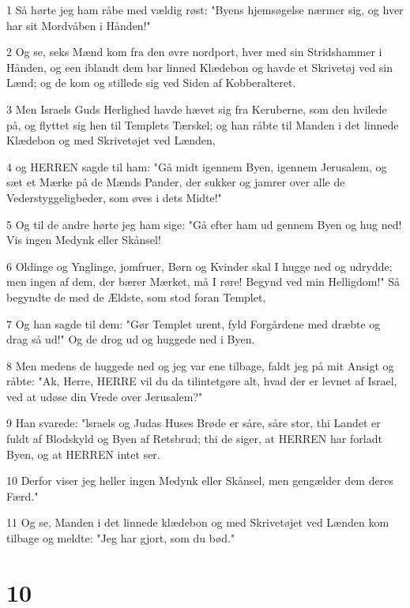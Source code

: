 \par 1 Så hørte jeg ham råbe med vældig røst: "Byens hjemsøgelse nærmer sig, og hver har sit Mordvåben i Hånden!"
\par 2 Og se, seks Mænd kom fra den øvre nordport, hver med sin Stridshammer i Hånden, og een iblandt dem bar linned Klædebon og havde et Skrivetøj ved sin Lænd; og de kom og stillede sig ved Siden af Kobberalteret.
\par 3 Men Israels Guds Herlighed havde hævet sig fra Keruberne, som den hvilede på, og flyttet sig hen til Templets Tærskel; og han råbte til Manden i det linnede Klædebon og med Skrivetøjet ved Lænden,
\par 4 og HERREN sagde til ham: "Gå midt igennem Byen, igennem Jerusalem, og sæt et Mærke på de Mænds Pander, der sukker og jamrer over alle de Vederstyggeligbeder, som øves i dets Midte!"
\par 5 Og til de andre hørte jeg ham sige: "Gå efter ham ud gennem Byen og hug ned! Vis ingen Medynk eller Skånsel!
\par 6 Oldinge og Ynglinge, jomfruer, Børn og Kvinder skal I hugge ned og udrydde; men ingen af dem, der bærer Mærket, må I røre! Begynd ved min Helligdom!" Så begyndte de med de Ældste, som stod foran Templet,
\par 7 Og han sagde til dem: "Gør Templet urent, fyld Forgårdene med dræbte og drag så ud!" Og de drog ud og huggede ned i Byen.
\par 8 Men medens de huggede ned og jeg var ene tilbage, faldt jeg på mit Ansigt og råbte: "Ak, Herre, HERRE vil du da tilintetgøre alt, hvad der er levnet af Israel, ved at udøse din Vrede over Jerusalem?"
\par 9 Han svarede: "lsraels og Judas Huses Brøde er såre, såre stor, thi Landet er fuldt af Blodskyld og Byen af Retsbrud; thi de siger, at HERREN har forladt Byen, og at HERREN intet ser.
\par 10 Derfor viser jeg heller ingen Medynk eller Skånsel, men gengælder dem deres Færd."
\par 11 Og se, Manden i det linnede klædebon og med Skrivetøjet ved Lænden kom tilbage og meldte: "Jeg har gjort, som du bød."

\chapter{10}

